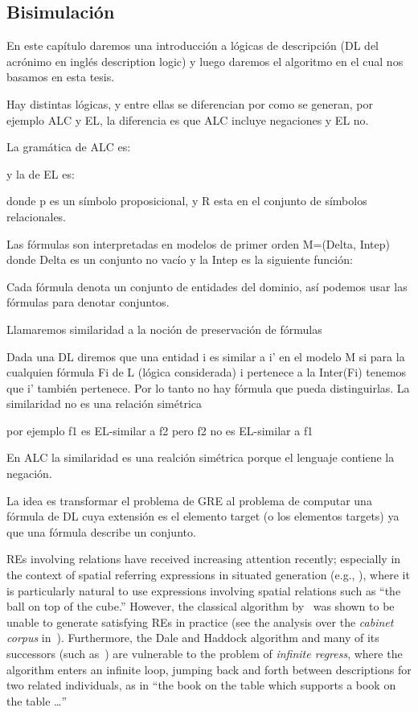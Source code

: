 \subsection{Bisimulaci\'on}

En este cap\'itulo daremos una introducci\'on a l\'ogicas de descripci\'on (DL del acr\'onimo en ingl\'es description logic) y luego daremos el algoritmo en el cual nos basamos en esta tesis.

Hay distintas l\'ogicas, y entre ellas se diferencian por como se generan, por ejemplo ALC y EL, la diferencia es que ALC incluye negaciones y EL no.

La gram\'atica de ALC es:


y la de EL es:


donde p es un s\'imbolo proposicional, y R esta en el conjunto de s\'imbolos relacionales.

Las f\'ormulas son interpretadas en modelos de primer orden M=(Delta, Intep) donde Delta es un conjunto no vac\'io y la Intep es la siguiente funci\'on:

Cada f\'ormula denota un conjunto de entidades del dominio, as\'i podemos usar las f\'ormulas para denotar conjuntos.

Llamaremos similaridad a la noci\'on de preservaci\'on de f\'ormulas

Dada una DL diremos que una entidad i es similar a i' en el modelo M si para la cualquien f\'ormula Fi de L (l\'ogica considerada) i pertenece a la Inter(Fi) tenemos que i' tambi\'en pertenece. Por lo tanto no hay f\'ormula que pueda distinguirlas. La similaridad no es una relaci\'on sim\'etrica

por ejemplo f1 es EL-similar a f2 pero f2 no es EL-similar a f1 

En ALC la similaridad es una realci\'on sim\'etrica porque el lenguaje contiene la negaci\'on.

La idea es transformar el problema de GRE al problema de computar una f\'ormula de DL cuya extensi\'on es el elemento target (o los elementos targets) ya que una f\'ormula describe un conjunto.



REs involving relations have received increasing attention recently;
especially in the context of spatial referring expressions in situated
generation (e.g., \cite{kelleher06:increm}),
where it is particularly natural to use expressions involving spatial
relations such as ``the ball on top of the cube.''  However, the
classical algorithm
by~\cite{dale91:gener} was shown to be
unable to generate satisfying REs in practice (see the analysis over
the \emph{cabinet corpus}
in~\cite{viethen06:_algor_for_gener_refer_expres}).  Furthermore, the
Dale and Haddock algorithm and many of its successors (such
as~\cite{kelleher06:increm}) are vulnerable to
the problem of \emph{infinite regress}, where the algorithm enters an
infinite loop, jumping back and forth between descriptions for two
related individuals, as in ``the book on the table which supports a
book on the table \ldots''

